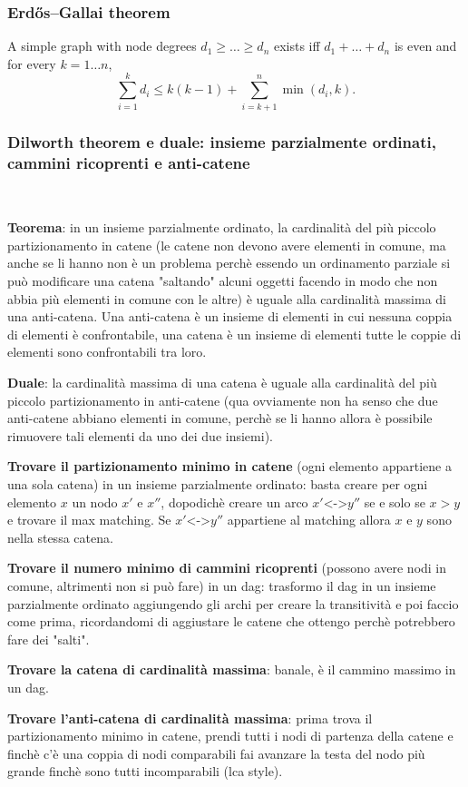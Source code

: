 \subsubsection{Erdős–Gallai theorem}
		A simple graph with node degrees $d_1 \ge \dots \ge d_n$ exists iff $d_1 + \dots + d_n$ is even and for every $k = 1\dots n$,
		\[ \sum _{i=1}^{k}d_{i}\leq k(k-1)+\sum _{i=k+1}^{n}\min(d_{i},k). \]

\subsubsection{Dilworth theorem e duale: insieme parzialmente ordinati, cammini ricoprenti e anti-catene}
\,

\textbf{Teorema}: in un insieme parzialmente ordinato, la cardinalità del più piccolo partizionamento in catene (le catene non devono avere elementi in comune, ma anche se li hanno 
non è un problema perchè essendo un ordinamento parziale si può modificare una catena  "saltando" alcuni oggetti facendo in modo che non abbia più elementi in comune con le altre) è
uguale alla cardinalità massima di una anti-catena. Una anti-catena è un insieme di elementi in cui nessuna coppia di elementi è confrontabile, una catena è un insieme di elementi 
tutte le coppie di elementi sono  confrontabili tra loro. 

\textbf{Duale}: la cardinalità massima di una catena è uguale alla cardinalità del più piccolo partizionamento in anti-catene (qua 
ovviamente non ha senso che due anti-catene abbiano elementi in comune, perchè se li hanno allora è possibile rimuovere tali elementi da uno dei due insiemi). 

\textbf{Trovare il partizionamento minimo in catene} (ogni elemento appartiene a una sola catena) in un insieme parzialmente ordinato: basta creare per ogni elemento $x$ un nodo $x'$ e $x''$, dopodichè creare un arco $x'$<->$y''$ se e solo se $x>y$ e trovare il max matching. Se
$x'$<->$y''$ appartiene al matching allora $x$ e $y$ sono nella stessa catena. 

\textbf{Trovare il numero minimo di cammini ricoprenti} (possono avere nodi in comune, altrimenti non si può fare) in un dag: trasformo il dag in un insieme parzialmente ordinato aggiungendo gli archi per creare la transitività e poi faccio come prima, ricordandomi di aggiustare le catene che ottengo perchè potrebbero fare dei "salti".

\textbf{Trovare la catena di cardinalità massima}: banale, è il cammino massimo in un dag. 

\textbf{Trovare l'anti-catena di cardinalità massima}: prima trova il partizionamento
minimo in catene, prendi tutti i nodi di partenza della catene e finchè c'è una coppia di nodi comparabili fai avanzare la testa del nodo più grande finchè sono tutti incomparabili (lca style).

